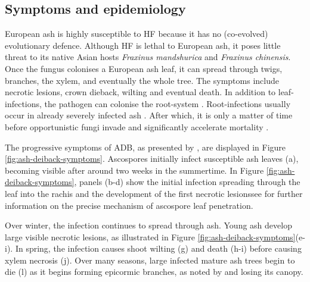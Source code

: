 \subsection{Symptoms and epidemiology}

European ash is highly susceptible to HF because it has no (co-evolved) evolutionary defence.
Although HF is lethal to European ash, it poses little threat to its native Asian hosts 
\textit{Fraxinus mandshurica} and \textit{Fraxinus chinensis}. Once the fungus colonises a European ash leaf,
it can spread through twigs, branches, the xylem, and eventually the whole tree.
The symptoms include necrotic lesions, crown dieback, wilting and eventual death.
In addition to leaf-infections, the pathogen can colonise the root-system \cite{schumacher2011general}.
Root-infections usually occur in already severely infected ash \cite{https://doi.org/10.1111/mpp.12073}. 
After which, it is only a matter of time before opportunistic fungi invade and significantly accelerate mortality
\cite{enderle2013temporal}.

The progressive symptoms of ADB, as presented by \cite{gross2014h}, are displayed in Figure \ref{fig:ash-deiback-symptoms}.
Ascospores initially infect susceptible ash leaves (a), 
becoming visible after around two weeks \cite{https://doi.org/10.1111/ppa.12048} in the summertime. 
In Figure \ref{fig:ash-deiback-symptoms}, panels (b-d) show the initial infection spreading through 
the leaf into the rachis and the development of the first necrotic lesions\textemdash see
\cite{https://doi.org/10.1111/ppa.12844} for further information on the precise mechanism of ascospore leaf penetration.

Over winter, the infection continues to spread through ash. 
Young ash develop large visible necrotic lesions, as illustrated in Figure \ref{fig:ash-deiback-symptoms}(e-i).
In spring, the infection causes shoot wilting (g) and death (h-i) before causing xylem necrosis (j).
Over many seasons, large infected mature ash trees begin to die (l) as it begins forming epicormic branches, 
as noted by \cite{marciulyniene2017can} and losing its canopy.


